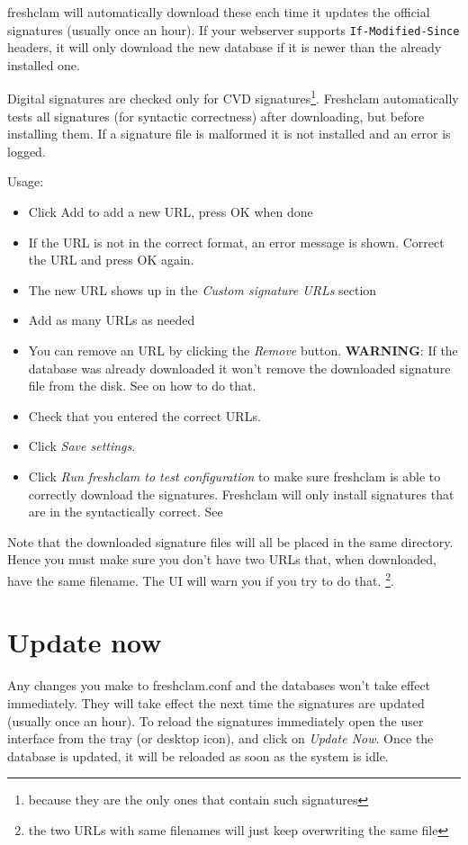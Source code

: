 \Gls{freshclam} will automatically download these each time it updates the official signatures (usually once an hour).
If your webserver supports \verb+If-Modified-Since+ headers, it will only
download the new database if it is newer than the already installed one.

Digital signatures  are checked only for \gls{CVD} signatures\footnote{because they are the only ones that contain such signatures}.
Freshclam automatically tests all signatures (for syntactic correctness) after downloading, but
before installing them. If a signature file is malformed it is not installed and
an error is logged.

Usage:
\begin{itemize}
\item Click Add to add a new URL, press OK when done
\item If the URL is not in the correct format, an error message is shown.
Correct the URL and press OK again.
\item The new URL shows up in the \emph{Custom signature URLs} section
\item Add as many URLs as needed
\item You can remove an URL by clicking the \emph{Remove} button.
\textbf{WARNING}: If the database was already downloaded it won't remove the downloaded signature file from the disk.
See  on how to do that.
\item Check that you entered the correct URLs.
\item Click \emph{Save settings}.
\item Click \emph{Run freshclam to test configuration} to make sure freshclam is
able to correctly download the signatures. Freshclam will only install
signatures that are in the syntactically correct.
See 
\end{itemize}

Note that the downloaded signature files will all be placed in the same directory. Hence you must make sure you don't have two URLs that, when downloaded, have the same filename.
The UI will warn you if you try to do that. \footnote{the two URLs with same filenames will just keep overwriting the same file}.
\section{Update now}
\label{sec:updatenow}
Any changes you make to \gls{freshclam.conf} and the databases won't take effect immediately.
They will take effect the next time the signatures are updated (usually once an hour).
To reload the signatures immediately open the \CW user interface from the tray (or desktop icon), and click on \emph{Update Now}. 
Once the database is updated, it will be reloaded as soon as the system is idle.